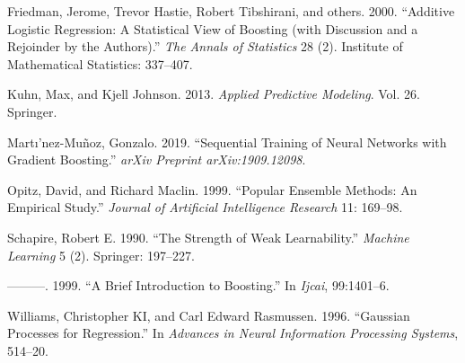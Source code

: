 \documentclass[
	12pt,				%
	a4paper,		%
	oneside,    %
	chapter=TITLE,		   %
	section=TITLE,		   %
	subsection=TITLE,	   %
	subsubsection=TITLE, %
	english,			%
	french,				%
	spanish,			%
	brazil,				%
]{abntex2}
\begin{document}
\leavevmode\hypertarget{ref-friedman2000additive}{}%
Friedman, Jerome, Trevor Hastie, Robert Tibshirani, and others. 2000.
``Additive Logistic Regression: A Statistical View of Boosting (with
Discussion and a Rejoinder by the Authors).'' \emph{The Annals of
Statistics} 28 (2). Institute of Mathematical Statistics: 337--407.

\leavevmode\hypertarget{ref-kuhn2013applied}{}%
Kuhn, Max, and Kjell Johnson. 2013. \emph{Applied Predictive Modeling}.
Vol. 26. Springer.

\leavevmode\hypertarget{ref-martinez2019sequential}{}%
Martı'nez-Muñoz, Gonzalo. 2019. ``Sequential Training of Neural Networks
with Gradient Boosting.'' \emph{arXiv Preprint arXiv:1909.12098}.

\leavevmode\hypertarget{ref-opitz1999popular}{}%
Opitz, David, and Richard Maclin. 1999. ``Popular Ensemble Methods: An
Empirical Study.'' \emph{Journal of Artificial Intelligence Research}
11: 169--98.

\leavevmode\hypertarget{ref-schapire1990strength}{}%
Schapire, Robert E. 1990. ``The Strength of Weak Learnability.''
\emph{Machine Learning} 5 (2). Springer: 197--227.

\leavevmode\hypertarget{ref-schapire1999brief}{}%
---------. 1999. ``A Brief Introduction to Boosting.'' In \emph{Ijcai},
99:1401--6.

\leavevmode\hypertarget{ref-williams1996gaussian}{}%
Williams, Christopher KI, and Carl Edward Rasmussen. 1996. ``Gaussian
Processes for Regression.'' In \emph{Advances in Neural Information
Processing Systems}, 514--20.

\postextual



\printindex
\end{document}
